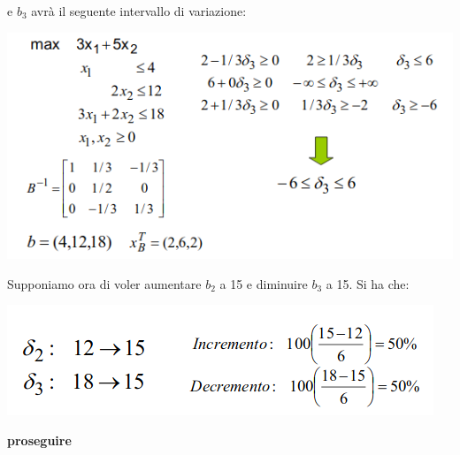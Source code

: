 \documentclass[a4paper,12pt, oneside]{book}
\begin{document}
\begin{esempio}
\begin{center}
  \end{center}
  e $b_3$ avrà il seguente intervallo di variazione:
  \begin{center}
    \includegraphics[scale = 0.7]{img/add4.png}
  \end{center}
  Supponiamo ora di voler aumentare $b_2$ a 15 e diminuire $b_3$ a
  15. Si ha che:
  \begin{center}
    \includegraphics[scale = 0.6]{img/add5.png}
  \end{center}
\end{esempio}
\textbf{proseguire}
\end{document}
